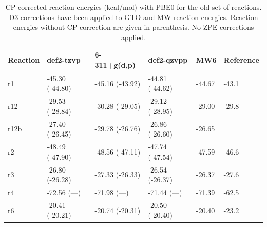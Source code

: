 \documentclass[11pt,a4paper]{article}
\begin{document}
\begin{table}[H]
	\centering
	\label{tab: rxn energies old pbe0}
	\caption{CP-corrected reaction energies (\si{kcal/mol}) with PBE0 for the old set of reactions. D3 corrections have been applied to GTO and MW reaction energies. Reaction energies without CP-correction are given in parenthesis. No ZPE corrections applied.}
	\begin{tabular}{l l l l l l}
		\toprule
		Reaction & def2-tzvp       & 6-311+g(d,p)    & def2-qzvpp      & MW6    & Reference \parencite{dohm2018} \\ 
		\midrule
		r1       & -45.30 (-44.80) & -45.16 (-43.92) & -44.81 (-44.62) & -44.67 & -43.1                          \\
		r12      & -29.53 (-28.84) & -30.28 (-29.05) & -29.12 (-28.95) & -29.00 & -29.8                          \\
		r12b     & -27.40 (-26.45) & -29.78 (-26.76) & -26.86 (-26.60) & -26.65 &                                \\
		r2       & -48.49 (-47.90) & -48.56 (-47.11) & -47.74 (-47.54) & -47.59 & -46.6                          \\
		r3       & -26.80 (-26.28) & -27.33 (-26.33) & -26.54 (-26.37) & -26.37 & -27.6                          \\
		r4       & -72.56 (---)    & -71.98 (---)    & -71.44 (---)    & -71.39 & -62.5                          \\
		r6       & -20.41 (-20.21) & -20.74 (-20.31) & -20.50 (-20.40) & -20.40 & -23.2                          \\ 
		\bottomrule
	\end{tabular}
\end{table}
	

\printbibliography
\end{document}
